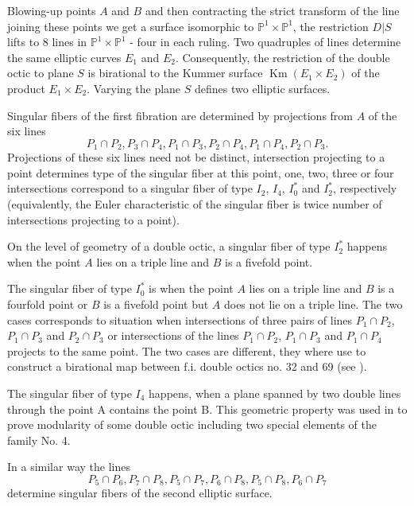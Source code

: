 \documentclass[12pt]{amsart}
\theoremstyle{plain}
\theoremstyle{remark}
\theoremstyle{definition}
\newcommand{\PP}{\mathbb P}
\numberwithin{table}{section}
\begin{document}
Blowing-up points $A$ and $B$ and then contracting the strict transform of the line joining these points we get a surface isomorphic to $\PP^{1}\times\PP^{1}$, the restriction $D|S$ lifts to 8 lines in  $\PP^{1}\times\PP^{1}$ - four in each ruling.
Two quadruples of lines determine the same elliptic curves $E_{1}$
 and $E_{2}$. Consequently, the restriction of the double octic to plane $S$ is birational to the Kummer surface $\operatorname{Km}(E_{1}\times E_{2})$ of the product $E_{1}\times E_{2}$. Varying the plane $S$ defines two elliptic surfaces.

Singular fibers of the first fibration are determined by projections from $A$ of the six lines
\[P_{1}\cap P_{2}, P_{3}\cap P_{4}, P_{1}\cap P_{3}, P_{2}\cap P_{4}, P_{1}\cap P_{4}, P_{2}\cap P_{3}.\]
Projections of these six lines need not be distinct, intersection projecting to a point determines type of the singular fiber at this point, one, two, three or four intersections  correspond to a singular fiber of type $I_{2}$, $I_{4}$, $I_{0}^{*}$ and $I_{2}^{*}$, respectively (equivalently, the Euler characteristic of the singular fiber is twice number of intersections projecting to a point).

On the level of geometry of a double octic, a singular fiber of type $I_{2}^{*}$ happens when
the point $A$ lies on a triple line and $B$ is a fivefold point.

The singular fiber of type $I_{0}^{*}$ is when the point $A$ lies on a triple line and $B$ is a fourfold point or $B$ is a fivefold point but $A$ does not lie on a triple line.
The two cases corresponds to situation when intersections of three pairs of lines  $P_{1}\cap P_{2}$, $P_{1}\cap P_{3}$ and  $P_{2}\cap P_{3}$ or intersections of the lines  $P_{1}\cap P_{2}$, $P_{1}\cap P_{3}$ and $P_{1}\cap P_{4}$ projects to the same point.
The two cases are  different, they where use to construct a birational map between f.i. double octics no. 32 and 69 (see \cite{CK-C}).

The singular fiber of type $I_{4}$ happens, when a plane spanned by two double lines through the point A contains the point B. This geometric property was used in  \cite{CM} to prove modularity of some double octic including two special elements of the family No. 4.




In a similar way the lines \[P_{5}\cap P_{6}, P_{7}\cap P_{8}, P_{5}\cap P_{7}, P_{6}\cap P_{8}, P_{5}\cap P_{8}, P_{6}\cap P_{7}\]
determine singular fibers of the second elliptic surface.
\end{document}
